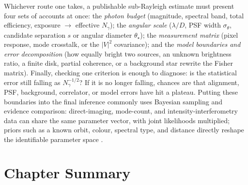 Whichever route one takes, a publishable sub-Rayleigh estimate must present four sets of accounts at once: the \emph{photon budget} (magnitude, spectral band, total efficiency, exposure $\to$ effective $N_\gamma$); the \emph{angular scale} ($\lambda/D$, PSF width $\sigma_\theta$, candidate separation $s$ or angular diameter $\theta_\star$); the \emph{measurement matrix} (pixel response, mode crosstalk, or the $|V|^2$ covariance); and the \emph{model boundaries and error decomposition} (how equally bright two sources, an unknown brightness ratio, a finite disk, partial coherence, or a background star rewrite the Fisher matrix). Finally, checking one criterion is enough to diagnose: is the statistical error still falling as $N_\gamma^{-1/2}$? If it is no longer falling, chances are that alignment, PSF, background, correlator, or model errors have hit a plateau. Putting these boundaries into the final inference commonly uses Bayesian sampling and evidence comparison: direct-imaging, mode-count, and intensity-interferometry data can share the same parameter vector, with joint likelihoods multiplied; priors such as a known orbit, colour, spectral type, and distance directly reshape the identifiable parameter space \citep{2009MNRAS.398.1601F,2013PASP..125..306F}.


\section{Chapter Summary}
\label{sec:e12-summary}

